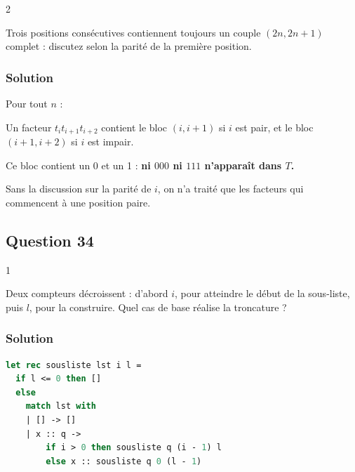 \documentclass[11pt,a4paper]{article}
\newcommand{\equationajustee}[1]{%
  \sbox{\boiteequation}{$\displaystyle #1$}%
  \ifdim\wd\boiteequation>\linewidth
    \[\resizebox{\linewidth}{!}{\usebox{\boiteequation}}\]%
  \else
    \[#1\]%
  \fi}
\begin{document}
\begin{indication}{2}

Trois positions consécutives contiennent toujours un couple \((2n,2n+1)\) complet : discutez selon la parité de la première position.

\end{indication}

\hypertarget{solution-32}{%
\subsubsection{Solution}\label{solution-32}}

Pour tout \(n\) :

\equationajustee{t_{2n}t_{2n+1}=t_n\overline{t_n}\in\{01,10\}.}

Un facteur \(t_it_{i+1}t_{i+2}\) contient le bloc \((i,i+1)\) si \(i\) est pair, et le bloc \((i+1,i+2)\) si \(i\) est impair.

Ce bloc contient un 0 et un 1 : \textbf{ni \(000\) ni \(111\) n'apparaît dans \(T\).}

\begin{piege}

Sans la discussion sur la parité de \(i\), on n'a traité que les facteurs qui commencent à une position paire.

\end{piege}

\hypertarget{question-34}{%
\subsection{Question 34}\label{question-34}}

\begin{indication}{1}

Deux compteurs décroissent : d'abord \(i\), pour atteindre le début de la sous-liste, puis \(l\), pour la construire. Quel cas de base réalise la troncature ?

\end{indication}

\hypertarget{solution-33}{%
\subsubsection{Solution}\label{solution-33}}

\begin{lstlisting}[language=Caml]
let rec sousliste lst i l =
  if l <= 0 then []
  else
    match lst with
    | [] -> []
    | x :: q ->
        if i > 0 then sousliste q (i - 1) l
        else x :: sousliste q 0 (l - 1)
\end{lstlisting}
\end{document}
